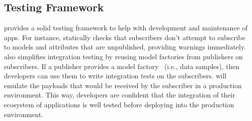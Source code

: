 \subsection{Testing Framework}
\label{synapse:sec:testing}

\synapse provides a solid testing framework to help with development and
maintenance of apps.  For instance, \synapse statically checks that subscribers
don't attempt to subscribe to models and attributes that are unpublished,
providing warnings immediately. \synapse also simplifies integration testing by
reusing model factories from publishers on subscribers.  If a publisher
provides a model factory~\cite{factory-girl} (i.e., data samples), then
developers can use them to write integration tests on the subscribers.
\synapse will emulate the payloads that would be received by the subscriber in a
production environment. This way, developers are confident that the integration
of their ecosystem of applications is well tested before deploying into the
production environment.


\begin{table}[t]
 \caption{{\bf Support for Various DBs.}
 Shows ORM- and DB-specific lines of code (LoC) to support varied DBs.
 For ORMs supporting many DBs (e.g., ActiveRecord), adding a new DB comes for free.}
 \label{synapse:tab:db-heterogeneity}
\end{table}

